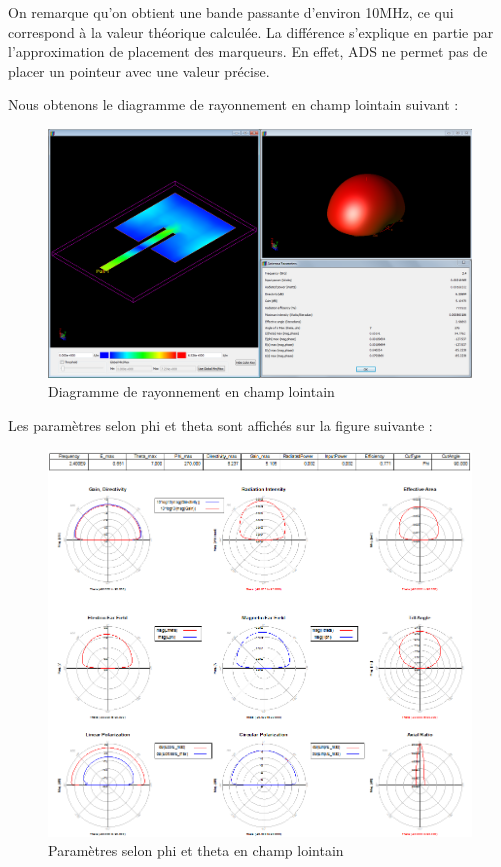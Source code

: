 \documentclass[16pt,a4paper,oneside,titlepage]{report}
\begin{document}
On remarque qu'on obtient une bande passante d'environ 10MHz, ce qui correspond à la valeur théorique calculée. La différence s'explique en partie par l'approximation de placement des marqueurs. En effet, ADS ne permet pas de placer un pointeur avec une valeur précise.

Nous obtenons le diagramme de rayonnement en champ lointain suivant :
\begin{figure}[h]
\center
\includegraphics[scale=0.25]{Images/P3_Q8-ab.png}
\caption{Diagramme de rayonnement en champ lointain}
\end{figure}

Les paramètres selon phi et theta sont affichés sur la figure suivante :
\begin{figure}[h]
\center
\includegraphics[scale=0.55]{Images/P3_Q8-cd.png}
\caption{Paramètres selon phi et theta en champ lointain}
\end{figure}
\end{document}
